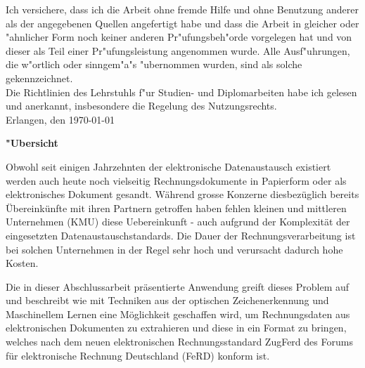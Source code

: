 \documentclass[english,mt]{lmedoc}
\begin{document}
\clearpage
  \begin{deckblatt}
  \end{deckblatt}

\cleardoublepage


Ich versichere, dass ich die Arbeit ohne fremde Hilfe und ohne Benutzung
anderer als der angegebenen Quellen angefertigt habe und dass die Arbeit
in gleicher oder "ahnlicher Form noch keiner anderen Pr"ufungsbeh"orde
vorgelegen hat und von dieser als Teil einer Pr"ufungsleistung
angenommen wurde. Alle Ausf"uhrungen, die w"ortlich oder sinngem"a"s
"ubernommen wurden, sind als solche gekennzeichnet.
\\

Die Richtlinien des Lehrstuhls f"ur Studien- und Diplomarbeiten
habe ich gelesen und anerkannt, insbesondere die Regelung des
Nutzungsrechts. \\[15mm]
Erlangen, den  \today \hspace{6.0cm} \\[10mm]


\cleardoublepage

\begin{center}
\bfseries
"Ubersicht
\normalfont

Obwohl seit einigen Jahrzehnten der elektronische Datenaustausch existiert werden auch heute noch vielseitig Rechnungsdokumente in Papierform oder als elektronisches Dokument gesandt. W\"ahrend grosse Konzerne diesbez\"uglich bereits \"Ubereink\"unfte mit ihren Partnern getroffen haben fehlen kleinen und mittleren Unternehmen (KMU) diese Uebereinkunft - auch aufgrund der Komplexit\"at der eingesetzten Datenaustauschstandards.
Die Dauer der Rechnungsverarbeitung ist bei solchen Unternehmen in der Regel sehr hoch und verursacht dadurch hohe Kosten. 

Die in dieser Abschlussarbeit pr\"asentierte Anwendung greift dieses Problem auf und beschreibt wie mit Techniken aus der optischen Zeichenerkennung und Maschinellem Lernen eine M\"oglichkeit geschaffen wird, um Rechnungsdaten aus elektronischen Dokumenten zu extrahieren und diese in ein Format zu bringen, welches nach dem neuen elektronischen Rechnungsstandard ZugFerd des Forums f\"ur elektronische Rechnung Deutschland (FeRD) konform ist.

\end{center}
\end{document}
